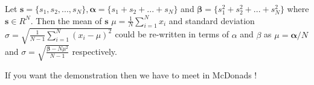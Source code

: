 \documentclass[a4paper,twoside,12pt]{article}
\begin{document}
Let $ \mathbf{s} = \{ s_1, s_2, ... , s_N \}, \mathbf{\alpha} = \{s_1 + s_2 + ... + s_N \}$ and $\mathbf{\beta} = \{s_1^2 + s_2^2 + ... + s_N^2 \}$ where $\mathbf{s} \in R^N$. Then the mean of $\mathbf{s}$ $\mu = \frac{1}{N} \sum_{i=1}^N{x_i}$ and standard deviation $ \sigma = \sqrt{\frac{1}{N - 1} \sum_{i=1}^N{(x_i - \mu)^2} } $ could be re-written in terms of $\alpha$ and $\beta$ as $ \mu = \mathbf{\alpha} / N$ and $ \sigma = \sqrt{ \frac{\mathbf{\beta} - N\mu^2}{N-1}} $ respectively.

If you want the demonstration then we have to meet in McDonads !
\end{document}
